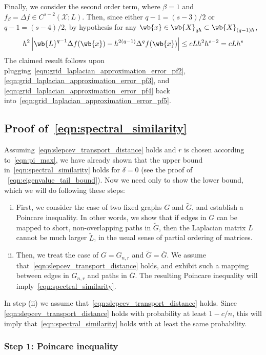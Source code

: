 \documentclass{article}
\newcommand{\abs}[1]{\left \lvert #1 \right \rvert}
\newcommand{\1}{\mathbf{1}}
\newcommand{\Xset}{\mathcal{X}}
\newcommand{\wt}[1]{\widetilde{#1}}
\theoremstyle{alden}
\theoremstyle{aldenthm}
\theoremstyle{definition}
\theoremstyle{remark}
\begin{document}
Finally, we consider the second order term, where $\beta = 1$ and $f_\beta = \Delta f \in C^{s - 2}(\Xset;L)$. Then, since either $q - 1 = (s - 3)/2$ or $q - 1 = (s - 4)/2$, by hypothesis for any $\wb{x} \in \wb{X}_{qh} \subset \wb{X}_{(q - 1)h} $,
\begin{equation}
\label{eqn:grid_laplacian_approximation_error_pf4}
h^{2}\abs{ \wb{L}^{q - 1} \Delta f(\wb{x}) - h^{2(q - 1)} \Delta^{q} f(\wb{x})  } \leq cL h^{2}h^{s - 2} = cLh^s
\end{equation}
The claimed result follows upon plugging~\eqref{eqn:grid_laplacian_approximation_error_pf2},\eqref{eqn:grid_laplacian_approximation_error_pf3}, and \eqref{eqn:grid_laplacian_approximation_error_pf4} back into~\eqref{eqn:grid_laplacian_approximation_error_pf5}.

\subsection{Proof of~\eqref{eqn:spectral_similarity}}

Assuming~\eqref{eqn:slepcev_transport_distance} holds and $r$ is chosen according to~\eqref{eqn:pi_max}, we have already shown that the upper bound in~\eqref{eqn:spectral_similarity} holds for $\delta = 0$ (see the proof of ~\eqref{eqn:eigenvalue_tail_bound}). Now we need only to show the lower bound, which we will do following these steps:
\begin{enumerate}[(i)]
	\item First, we consider the case of two fixed graphs $G$ and $\wt{G}$, and establish a Poincare inequality. In other words, we show that if edges in $G$ can be mapped to short, non-overlapping paths in $\wt{G}$, then the Laplacian matrix $L$ cannot be much larger $\wt{L}$, in the usual sense of partial ordering of matrices.
	\item Then, we treat the case of $G = G_{n,r}$ and $\wt{G} = \overline{G}$. We assume that~\eqref{eqn:slepcev_transport_distance} holds, and exhibit such a mapping between edges in $G_{n,r}$ and paths in $\overline{G}$. The resulting Poincare inequality will imply~\eqref{eqn:spectral_similarity}.
\end{enumerate}
In step (ii) we assume that~\eqref{eqn:slepcev_transport_distance} holds. Since \eqref{eqn:slepcev_transport_distance} holds with probability at least $1 - c/n$, this will imply that~\eqref{eqn:spectral_similarity} holds with at least the same probability.

\subsubsection{Step 1: Poincare inequality}
\end{document}
